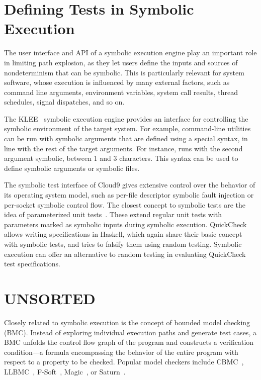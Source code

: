 
\section{Defining Tests in Symbolic Execution}
\label{sec:relwork:symtests}

The user interface and API of a symbolic execution engine play an important role in limiting path explosion, as they let users define the inputs and sources of nondeterminism that can be symbolic.  This is particularly relevant for system software, whose execution is influenced by many external factors, such as command line arguments, environment variables, system call results, thread schedules, signal dispatches, and so on.

The KLEE~\cite{klee} symbolic execution engine provides an interface for controlling the symbolic environment of the target system.  For example, command-line utilities can be run with symbolic arguments that are defined using a special syntax, in line with the rest of the target arguments.  For instance,  runs  with the second argument symbolic, between 1 and 3 characters.  This syntax can be used to define symbolic arguments or symbolic files.

The symbolic test interface of Cloud9 gives extensive control over the behavior of its operating system model, such as per-file descriptor symbolic fault injection or per-socket symbolic control flow.
%
The closest concept to symbolic tests are the idea of parameterized unit tests~\cite{tillmann-puts}. These extend regular unit tests with parameters marked as symbolic inputs during symbolic execution.
%
QuickCheck~\cite{quickcheck} allows writing specifications in Haskell, which again share their basic concept with symbolic tests, and tries to falsify them using random testing.  Symbolic execution can offer an alternative to random testing in evaluating QuickCheck test specifications.


\iffalse
\section{UNSORTED}

Closely related to symbolic execution is the concept of bounded model checking (BMC).  Instead of exploring individual execution paths and generate test cases, a BMC unfolds the control flow graph of the program and constructs a verification condition---a formula encompassing the behavior of the entire program with respect to a property to be checked.  Popular model checkers include CBMC~\cite{cbmc}, LLBMC~\cite{llbmc2012}, F-Soft~\cite{f-soft}, Magic~\cite{magic}, or Saturn~\cite{saturn}.

